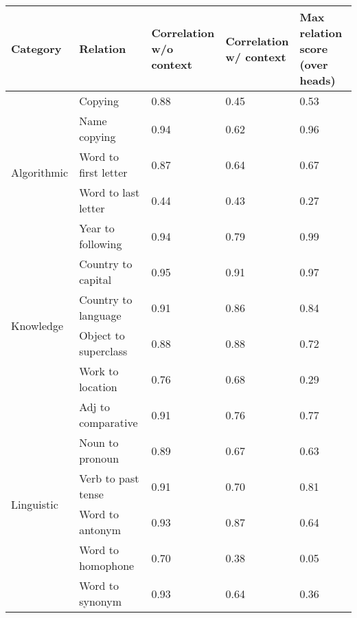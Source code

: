 \begin{tabular}{lllll}
\toprule
Category & Relation & \makecell{Correlation\\w/o context} & \makecell{Correlation\\w/ context} & \makecell{Max relation score\\(over heads)} \\
\midrule
\multirow{5}{*}{Algorithmic} & Copying & 0.88 & 0.45 & 0.53 \\
 & Name copying & 0.94 & 0.62 & 0.96 \\
 & Word to first letter & 0.87 & 0.64 & 0.67 \\
 & Word to last letter & 0.44 & 0.43 & 0.27 \\
 & Year to following & 0.94 & 0.79 & 0.99 \\
\multirow{4}{*}{Knowledge} & Country to capital & 0.95 & 0.91 & 0.97 \\
 & Country to language & 0.91 & 0.86 & 0.84 \\
 & Object to superclass & 0.88 & 0.88 & 0.72 \\
 & Work to location & 0.76 & 0.68 & 0.29 \\
\multirow{6}{*}{Linguistic} & Adj to comparative & 0.91 & 0.76 & 0.77 \\
 & Noun to pronoun & 0.89 & 0.67 & 0.63 \\
 & Verb to past tense & 0.91 & 0.70 & 0.81 \\
 & Word to antonym & 0.93 & 0.87 & 0.64 \\
 & Word to homophone & 0.70 & 0.38 & 0.05 \\
 & Word to synonym & 0.93 & 0.64 & 0.36 \\
\bottomrule
\end{tabular}
